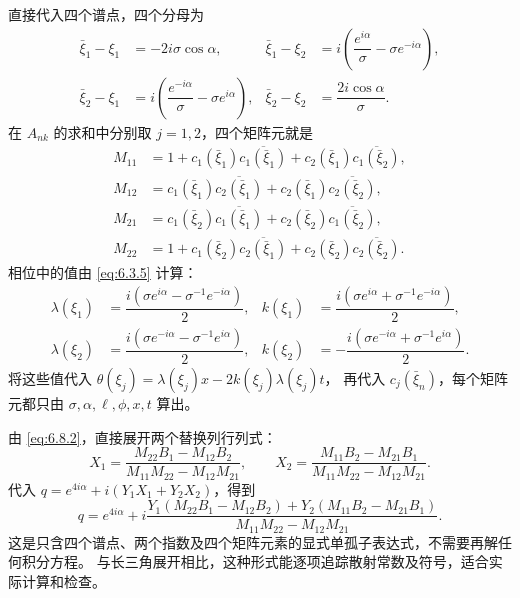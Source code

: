 \documentclass[lang=cn,scheme=chinese,mode=simple,device=normal,color=blue,
math=cm,thmcnt=section,12pt]{elegantbook}
\newcommand{\conj}[1]{\overline{#1}}
\begin{document}
\begin{callout}[计算：单四元组的四个分母与四个有限矩阵元]
    直接代入四个谱点，四个分母为
    \[
        \begin{aligned}
            \bar\xi_1-\xi_1 & =-2i\sigma\cos\alpha,                                           &
            \bar\xi_1-\xi_2 & =i\left(\dfrac{e^{i\alpha}}{\sigma}-\sigma e^{-i\alpha}\right),   \\
            \bar\xi_2-\xi_1 & =i\left(\dfrac{e^{-i\alpha}}{\sigma}-\sigma e^{i\alpha}\right), &
            \bar\xi_2-\xi_2 & =\dfrac{2i\cos\alpha}{\sigma}.
        \end{aligned}
    \]
    在 $A_{nk}$ 的求和中分别取 $j=1,2$，四个矩阵元就是
    \[
        \begin{aligned}
            M_{11} & =1+c_1(\bar\xi_1)\conj{c_1(\bar\xi_1)}+c_2(\bar\xi_1)\conj{c_1(\bar\xi_2)}, \\
            M_{12} & =c_1(\bar\xi_1)\conj{c_2(\bar\xi_1)}+c_2(\bar\xi_1)\conj{c_2(\bar\xi_2)},   \\
            M_{21} & =c_1(\bar\xi_2)\conj{c_1(\bar\xi_1)}+c_2(\bar\xi_2)\conj{c_1(\bar\xi_2)},   \\
            M_{22} & =1+c_1(\bar\xi_2)\conj{c_2(\bar\xi_1)}+c_2(\bar\xi_2)\conj{c_2(\bar\xi_2)}.
        \end{aligned}
    \]
    相位中的值由 \eqref{eq:6.3.5} 计算：
    \[
        \begin{aligned}
            \lambda(\xi_1) & =\dfrac{i(\sigma e^{i\alpha}-\sigma^{-1}e^{-i\alpha})}{2},  &
            k(\xi_1)       & =\dfrac{i(\sigma e^{i\alpha}+\sigma^{-1}e^{-i\alpha})}{2},    \\
            \lambda(\xi_2) & =\dfrac{i(\sigma e^{-i\alpha}-\sigma^{-1}e^{i\alpha})}{2},  &
            k(\xi_2)       & =-\dfrac{i(\sigma e^{-i\alpha}+\sigma^{-1}e^{i\alpha})}{2}.
        \end{aligned}
    \]
    将这些值代入 $\theta(\xi_j)=\lambda(\xi_j)x-2k(\xi_j)\lambda(\xi_j)t$，
    再代入 $c_j(\bar\xi_n)$，每个矩阵元都只由 $\sigma,\alpha,\ell,\phi,x,t$ 算出。
\end{callout}


由 \eqref{eq:6.8.2}，直接展开两个替换列行列式：
\[
    X_1=\dfrac{M_{22}B_1-M_{12}B_2}{M_{11}M_{22}-M_{12}M_{21}},\qquad
    X_2=\dfrac{M_{11}B_2-M_{21}B_1}{M_{11}M_{22}-M_{12}M_{21}}.
\]
代入 $q=e^{4i\alpha}+i(Y_1X_1+Y_2X_2)$，得到
\[
    q=e^{4i\alpha}+i\dfrac{Y_1(M_{22}B_1-M_{12}B_2)+Y_2(M_{11}B_2-M_{21}B_1)}
    {M_{11}M_{22}-M_{12}M_{21}}.
\]
这是只含四个谱点、两个指数及四个矩阵元素的显式单孤子表达式，不需要再解任何积分方程。
与长三角展开相比，这种形式能逐项追踪散射常数及符号，适合实际计算和检查。
\end{document}
